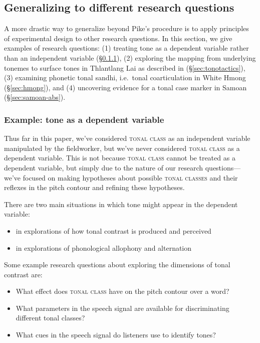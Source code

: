 \documentclass[12pt]{article}
\begin{document}

\subsection{Generalizing to different research questions}
\label{sec:gen-question}

A more drastic way to generalize beyond Pike's procedure is to apply
principles of experimental design to other research questions. In this
section, we give examples of research questions: (1) treating tone as a
dependent variable rather than an independent variable
(\S\ref{sec:tone-dv}), (2) exploring the mapping from underlying tonemes
to surface tones in Thlantlang Lai as described in \citet{Hyman:2007}
(\S\ref{sec:tonotactics}), (3) examining phonetic tonal sandhi, i.e.\
tonal coarticulation in White Hmong (\S\ref{sec:hmong}), and (4) uncovering
evidence for a tonal case marker in Samoan (\S\ref{sec:samoan-abs}). 
 

\subsubsection{Example: tone as a dependent variable}
\label{sec:tone-dv}

Thus far in this paper, we've considered \textsc{tonal class} as an independent
variable manipulated by the fieldworker, but we've never considered
\textsc{tonal class} as a dependent variable. This is not because
\textsc{tonal class} cannot be treated as a dependent variable, but
simply due to the nature of our research questions---we've focused
on making hypotheses about possible \textsc{tonal classes} and their
reflexes in the pitch contour and refining these hypotheses. 

There are two main situations in which tone might appear in the dependent
variable: 

\begin{itemize}
  \item in explorations of how tonal contrast is produced and perceived
  \item in explorations of phonological allophony and alternation 
\end{itemize}

Some example research questions about exploring the dimensions of
tonal contrast are:

\begin{itemize}
\item What effect does \textsc{tonal class} have on the pitch contour over a
word? 
\item What parameters in the speech signal are available for discriminating
different tonal classes?
\item What cues in the speech signal do listeners use to identify tones?
\end{itemize}
\end{document}
